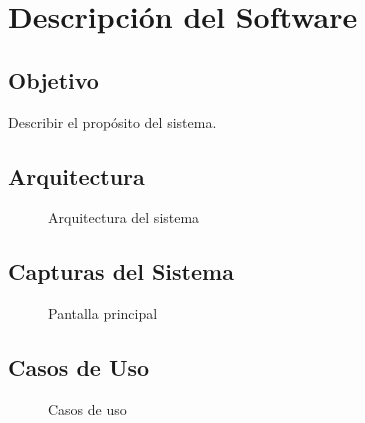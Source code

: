 \chapter{Descripción del Software}

\section{Objetivo}
Describir el propósito del sistema.

\section{Arquitectura}
\begin{figure}[H]
\centering
{}
\caption{Arquitectura del sistema}
\end{figure}

\section{Capturas del Sistema}

\begin{figure}[H]
\centering
{}
\caption{Pantalla principal}
\end{figure}

\section{Casos de Uso}

\begin{figure}[H]
\centering
{}
\caption{Casos de uso}
\end{figure}
